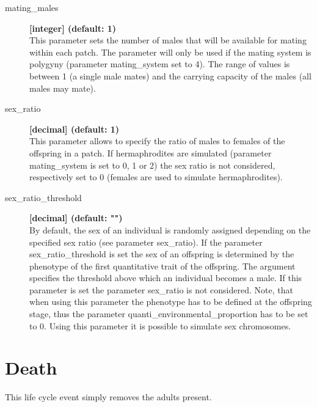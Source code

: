 \documentclass[letterpaper,12pt,oneside]{book}
\begin{document}
\begin{description}
\item[mating\_males] \textbf{[integer] (default: 1)}\\
This parameter sets the number of males that will be available for mating within each patch. The parameter will only be used if the mating system is polygyny (parameter \textsf{mating\_system} set to 4). The range of values is between 1 (a single male mates) and the carrying capacity of the males (all males may mate).

\item[sex\_ratio] \textbf{[decimal] (default: 1)}\\
This parameter allows to specify the ratio of males to females of the offspring in a patch. If hermaphrodites are simulated (parameter \textsf{mating\_system} is set to 0, 1 or 2) the sex ratio is not considered, respectively set to 0 (females are used to simulate hermaphrodites).

\item[sex\_ratio\_threshold] \textbf{[decimal] (default: "")}\\
By default, the sex of an individual is randomly assigned depending on the specified sex ratio (see parameter \textsf{sex\_ratio}). If the parameter \textsf{sex\_ratio\_threshold} is set the sex of an offspring is determined by the phenotype of the first quantitative trait of the offspring. The argument specifies the threshold above which an individual becomes a male. If this parameter is set the parameter \textsf{sex\_ratio} is not considered. Note, that when using this parameter the phenotype has to be defined at the offspring stage, thus the parameter \textsf{quanti\_environmental\_proportion} has to be set to 0. Using this parameter it is possible to simulate sex chromosomes.  

\end{description}


\section{Death}\label{sec:Death}
This life cycle event simply removes the adults present.
\end{document}
